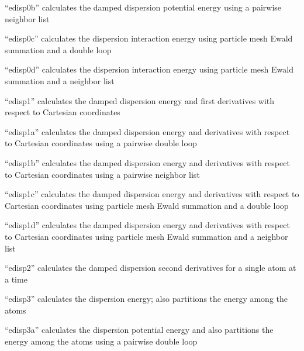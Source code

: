 \documentclass[letterpaper,11pt,english]{sphinxmanual}
\begin{document}
“edisp0b” calculates the damped dispersion potential energy
using a pairwise neighbor list


“edisp0c” calculates the dispersion interaction energy using
particle mesh Ewald summation and a double loop


“edisp0d” calculates the dispersion interaction energy using
particle mesh Ewald summation and a neighbor list


“edisp1” calculates the damped dispersion energy and first
derivatives with respect to Cartesian coordinates


“edisp1a” calculates the damped dispersion energy and
derivatives with respect to Cartesian coordinates using
a pairwise double loop


“edisp1b” calculates the damped dispersion energy and
derivatives with respect to Cartesian coordinates using
a pairwise neighbor list


“edisp1c” calculates the damped dispersion energy and
derivatives with respect to Cartesian coordinates using
particle mesh Ewald summation and a double loop


“edisp1d” calculates the damped dispersion energy and
derivatives with respect to Cartesian coordinates using
particle mesh Ewald summation and a neighbor list


“edisp2” calculates the damped dispersion second derivatives
for a single atom at a time


“edisp3” calculates the dispersion energy; also partitions
the energy among the atoms


“edisp3a” calculates the dispersion potential energy and
also partitions the energy among the atoms using a pairwise
double loop

\end{document}
